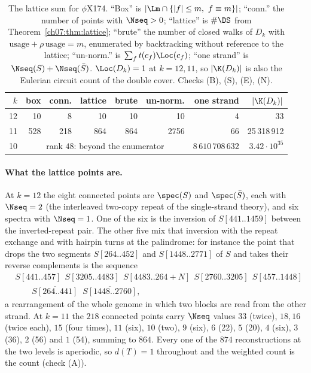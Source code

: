 \begin{table}[t]
\centering
\small
\begin{tabular}{rrrrrrrr}
\toprule
$k$ & box & conn. & lattice & brute & un-norm. & one strand & $|\K(D_k)|$\\
\midrule
12 &  10 &   8 &  10 &  10 &   10 &  4 & 33\\
11 & 528 & 218 & 864 & 864 & 2756 & 66 & 25\,318\,912\\
10 & \multicolumn{5}{c}{rank $48$: beyond the enumerator} & $8\,610\,708\,632$ & $3.42\cdot10^{35}$\\
\bottomrule
\end{tabular}
\caption{The lattice sum for $\phi$X174. ``Box'' is $|\Lm\cap\{|f|\le m,\ f\equiv m\}|$;
``conn.'' the number of points with $\Nseq>0$; ``lattice'' is $\#\DS$ from
Theorem~\ref{ch07:thm:lattice}; ``brute'' the number of closed walks of $D_k$ with
$\mathrm{usage}+\rho\,\mathrm{usage}=m$, enumerated by backtracking without reference to the
lattice; ``un-norm.'' is $\sum_f t(c_f)\Loc(c_f)$; ``one strand'' is
$\Nseq(S)+\Nseq(\bar S)$. $\Loc(D_k)=1$ at $k=12,11$, so $|\K(D_k)|$ is also the Eulerian
circuit count of the double cover. Checks (B), (S), (E), (N).}
\label{ch07:tab:lattice}
\end{table}

\paragraph{What the lattice points are.}
At $k=12$ the eight connected points are $\spec(S)$ and $\spec(\bar S)$, each with
$\Nseq=2$ (the interleaved two-copy repeat of the single-strand theory), and six spectra with
$\Nseq=1$. One of the six is the inversion of $S[441..1459]$ between the inverted-repeat pair.
The other five mix that inversion with the repeat exchange and with hairpin turns at the
palindrome: for instance the point that drops the two segments $S[264..452]$ and
$S[1448..2771]$ of $S$ and takes their reverse complements is the sequence
\begin{align*}
  &S[441..457]\;\,S[3205..4483]\;\,S[4483..264{+}N]\;\,S[2760..3205]\;\,S[457..1448]\\
  &\qquad\overline{S[264..441]}\;\;\overline{S[1448..2760]},
\end{align*}
a rearrangement of the whole genome in which two blocks are read from the other strand. At
$k=11$ the $218$ connected points carry $\Nseq$ values $33$ (twice), $18,16$ (twice each),
$15$ (four times), $11$ (six), $10$ (two), $9$ (six), $6$ (22), $5$ (20), $4$ (six), $3$ (36),
$2$ (56) and $1$ (54), summing to $864$. Every one of the $874$ reconstructions at the two
levels is aperiodic, so $d(T)=1$ throughout and the weighted count is the count (check (A)).

